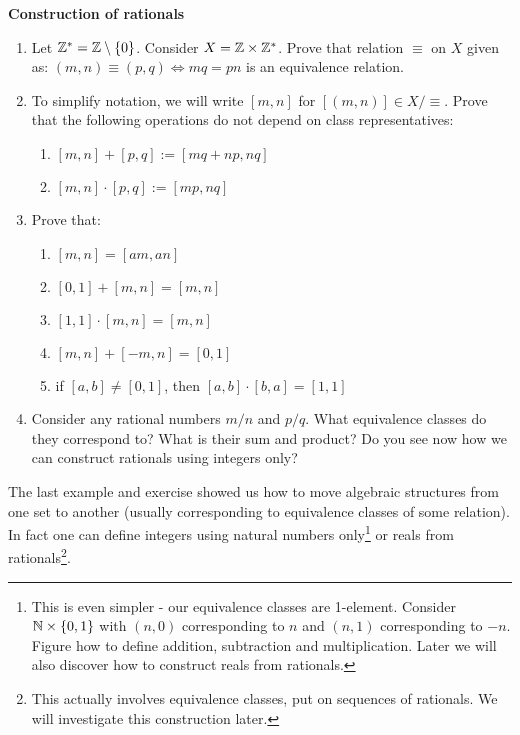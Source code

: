 \begin{exercise}
  \textbf{Construction of rationals}
  \begin{enumerate}
    \item Let $\mathbb Z^*=\mathbb Z\setminus\{0\}$. Consider $X=\mathbb Z\times \mathbb Z^*$. Prove that relation $\equiv$ on $X$ given as: $(m,n)\equiv (p,q)\Leftrightarrow mq=pn$ is an equivalence relation.
    \item To simplify notation, we will write $[m,n]$ for $[(m,n)]\in X/\equiv$. Prove that the following operations do not depend on class representatives:
      \begin{enumerate}
        \item $[m,n] + [p,q] := [mq+np, nq]$
        \item $[m,n]\cdot [p,q] := [mp, nq]$
      \end{enumerate}
    \item Prove that:
      \begin{enumerate}
        \item $[m,n]=[am,an]$
        \item $[0,1]+[m,n]=[m,n]$
        \item $[1,1]\cdot [m,n]=[m,n]$
        \item $[m,n] + [-m,n]=[0,1]$
        \item if $[a,b]\neq [0,1]$, then $[a,b]\cdot [b,a]=[1,1]$
      \end{enumerate}
    \item Consider any rational numbers $m/n$ and $p/q$. What equivalence classes do they correspond to? What is their sum and product? Do you see now how we can construct rationals using integers only?
  \end{enumerate}
\end{exercise}

The last example and exercise showed us how to move algebraic structures from one set to another (usually corresponding to equivalence classes of some relation). In fact one can define integers using natural numbers only\footnote{This is even simpler - our equivalence classes are 1-element. Consider $\mathbb N\times \{0,1\}$ with $(n,0)$ corresponding to $n$
and $(n,1)$ corresponding to $-n$. Figure how to define addition, subtraction and multiplication. Later we will also discover how to construct reals from rationals.} or reals from rationals\footnote{This actually involves equivalence classes, put on sequences of rationals. We will investigate this construction later.}.
